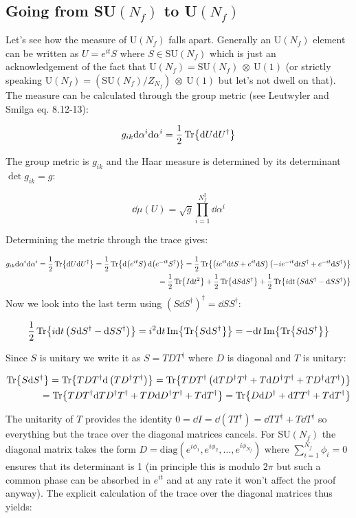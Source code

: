 \documentclass[a4,10pt,titlepage]{article}
\renewcommand\[{\begin{equation*}}
\renewcommand\]{\end{equation*}}
\newcommand{\be}{\begin{equation}}
\newcommand{\ee}{\end{equation}}
\numberwithin{equation}{section}
\newcommand{\ot}{\:\otimes\:}
\newcommand{\lp}{\left}
\newcommand{\rp}{\right}
\newcommand{\half}{\frac{1}{2}}
\begin{document}
\subsection{Going from SU$(N_f)$ to U$(N_f)$}

Let's see how the measure of U$(N_f)$ falls apart. Generally an U$(N_f)$ element can be written as $U=e^{it}S$ where $S\in \text{SU}(N_f)$ which is just an acknowledgement of the fact that U$(N_f)=\text{SU}(N_f)\ot \text{U}(1)$ (or strictly speaking U$(N_f)=\lp(\text{SU}(N_f)/Z_{N_f}\rp)\ot \text{U}(1)$ but let's not dwell on that). The measure can be calculated through the group metric (see Leutwyler and Smilga eq. 8.12-13):

\be
g_{ik}\dd\alpha^i\dd\alpha^i=\half\Tr{\dd U\dd U^\dagger}
\ee

The group metric is $g_{ik}$ and the Haar measure is determined by its determinant $\det g_{ik}=g$:




\be
\dd\mu(U)=\sqrt{g}\prod_{i=1}^{N_f^2}\dd\alpha^i
\ee


Determining the metric through the trace gives:

\be
\begin{split}
g_{ik}\dd\alpha^i\dd\alpha^i=\half\Tr{\dd U\dd U^\dagger}=\half\Tr{\dd(e^{it}S)\dd (e^{-it}S^\dagger)}=\half\Tr{\lp(ie^{it}\dd t S+e^{it}\dd S\rp)\lp(-ie^{-it}\dd t S^\dagger+e^{-it}\dd S^\dagger \rp)}\\
=\half\Tr{I\dd t^2}+\half\Tr{\dd S\dd S^\dagger}+\half\Tr{i\dd t \lp( S\dd S^\dagger - \dd S S^\dagger\rp)}
\end{split}
\ee
Now we look into the last term using $\lp( S\dd S^\dagger \rp)^\dagger=\dd S S^\dagger$:

\be
\half\Tr{i\dd t \lp(S\dd S^\dagger - \dd S S^\dagger\rp)}=i^2\dd t\Im{\Tr{S\dd S^\dagger}}=-\dd t\Im{\Tr{S\dd S^\dagger}}
\ee

Since $S$ is unitary we write it as $S=TDT^\dagger$ where $D$ is diagonal and $T$ is unitary:

\be
\begin{split}
\Tr{S\dd S^\dagger}=\Tr{TDT^\dagger\dd\lp(TD^\dagger T^\dagger\rp)}=\Tr{TDT^\dagger\lp(\dd T D^\dagger T^\dagger+T\dd D^\dagger T^\dagger+TD^\dagger\dd T^\dagger \rp)}\\
=\Tr{TDT^\dagger\dd TD^\dagger T^\dagger+TD\dd D^\dagger T^\dagger +T\dd T^\dagger}=\Tr{D\dd D^\dagger+\dd T T^\dagger+T\dd T^\dagger}
\end{split}
\ee

The unitarity of $T$ provides the identity $0=\dd I=\dd \lp(TT^\dagger\rp)=\dd T T^\dagger+T\dd T^\dagger$ so everything but the trace over the diagonal matrices cancels. For SU$(N_f)$ the diagonal matrix takes the form $D=\text{diag}\lp(e^{i\phi_1},e^{i\phi_2},\ldots, e^{i\phi_{N_f}}\rp)$ where $\sum_{i=1}^{N_f}\phi_i=0$ ensures that its determinant is 1 (in principle this is modulo $2\pi$ but such a common phase can be absorbed in $e^{it}$ and at any rate it won't affect the proof anyway). The explicit calculation of the trace over the diagonal matrices thus yields:
\end{document}
